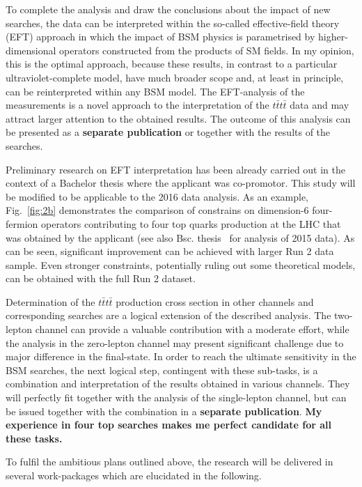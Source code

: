 \textcolor{\mynew}{
To complete the analysis and draw the conclusions about the impact of new searches, the data can be interpreted within the so-called effective-field theory (EFT) approach in which the impact of BSM physics is parametrised by higher-dimensional operators constructed from the products of SM fields. In my opinion, this is the optimal approach, because these results, in contrast to a particular ultraviolet-complete model, have much broader scope and, at least in principle, can be reinterpreted within any BSM model. The EFT-analysis of the measurements is a novel approach to the interpretation of the $t\bar{t}t\bar{t}$ data and may attract larger attention to the obtained results. The outcome of this analysis can be presented as a \textbf{separate publication} or together with the results of the searches. }

\textcolor{\mynew}{
Preliminary research on EFT interpretation has been already carried out in the context of a Bachelor thesis where the applicant was co-promotor. This study will be modified to be applicable to the 2016 data analysis. As an example, Fig.~\ref{fig:2b} demonstrates the comparison of constrains on dimension-6 four-fermion operators contributing to four top quarks production at the LHC that was obtained by the applicant (see also Bsc. thesis~\cite{MathiasThesis} for analysis of 2015 data). As can be seen, significant improvement can be achieved with larger Run 2 data sample. Even stronger constraints, potentially ruling out some theoretical models, can be obtained with the full Run 2 dataset.
}

\textcolor{\mycolor}{
Determination of the $t\bar{t}t\bar{t}$ production cross section in other channels and corresponding searches are a logical extension of the described analysis. The two-lepton channel can provide a valuable contribution with a moderate effort, while the analysis in the zero-lepton channel may present significant challenge due to major difference in the final-state. In order to reach the ultimate sensitivity in the BSM searches, the next logical step, contingent with these sub-tasks, is a combination and interpretation of the results obtained in various channels. They will perfectly fit together with the analysis of the single-lepton channel, but can be issued together with the combination in a \textbf{separate publication}. \textbf{My experience in four top searches makes me perfect candidate for all these tasks.}}

\textcolor{\mycolor}{
To fulfil the ambitious plans outlined above, the research will be delivered in several work-packages which are elucidated in the following.}
